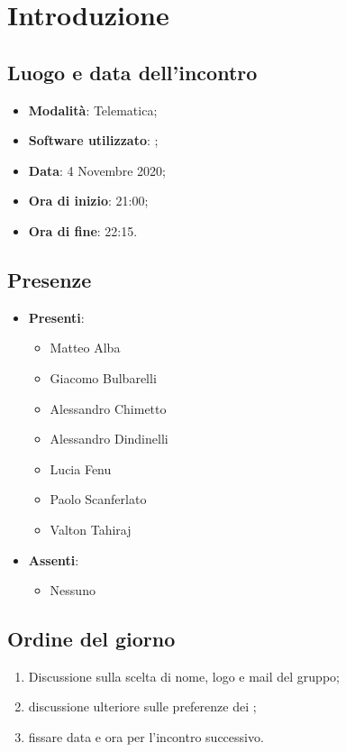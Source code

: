 \documentclass[]{article}
\begin{document}
	

	\newpage


	\section{Introduzione}
		\subsection{Luogo e data dell'incontro}
		\begin{itemize}
			\item \textbf{Modalità}: Telematica;
			\item \textbf{Software utilizzato}: ;
			\item \textbf{Data}: 4 Novembre 2020;
			\item \textbf{Ora di inizio}: 21:00;
			\item \textbf{Ora di fine}: 22:15.
		\end{itemize}

		\subsection{Presenze}
		\begin{itemize}
			\item \textbf{Presenti}:
			\begin{itemize}
				\item Matteo Alba
				\item Giacomo Bulbarelli
				\item Alessandro Chimetto
				\item Alessandro Dindinelli
				\item Lucia Fenu
				\item Paolo Scanferlato
				\item Valton Tahiraj
			\end{itemize}
			\item \textbf{Assenti}:
			\begin{itemize}
				\item Nessuno
			\end{itemize}
		\end{itemize}


		\subsection{Ordine del giorno}
		\begin{enumerate}
			\item Discussione sulla scelta di nome, logo e mail del gruppo;
			\item discussione ulteriore sulle preferenze dei ;
			\item fissare data e ora per l'incontro successivo.
		\end{enumerate}
\end{document}
